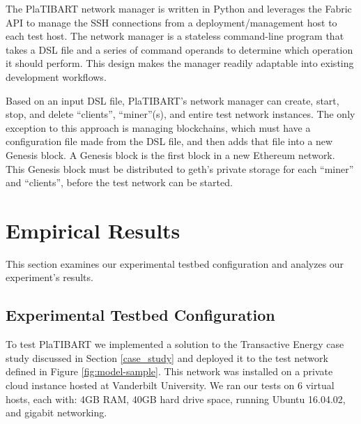 The PlaTIBART network manager is written in Python and leverages the Fabric API to manage the SSH connections from a deployment/management host to each test host. The network manager is a stateless command-line program that takes a DSL file and a series of command operands to determine which operation it should perform. This design makes the manager readily adaptable into existing development workflows. 

Based on an input DSL file, PlaTIBART's network manager can create, start, stop, and delete ``clients'', ``miner''(s), and entire test network instances. The only exception to this approach is managing blockchains, which must have a configuration file made from the DSL file, and then adds that file into a new Genesis block. A Genesis block is the first block in a new Ethereum network. This Genesis block must be distributed to geth's private storage for each ``miner'' and ``clients'', before the test network can be started.


%
%

\section{Empirical Results}
\label{empirical}
This section examines our experimental testbed configuration and analyzes our experiment's results.
\subsection{Experimental Testbed Configuration}

To test PlaTIBART we implemented a solution to the Transactive Energy case study discussed in Section \ref{case_study} and deployed it to the test network defined in Figure \ref{fig:model-sample}. This network was installed on a private cloud instance hosted at Vanderbilt University. We ran our tests on 6 virtual hosts, each with: 4GB RAM, 40GB hard drive space, running Ubuntu 16.04.02, and gigabit networking.

